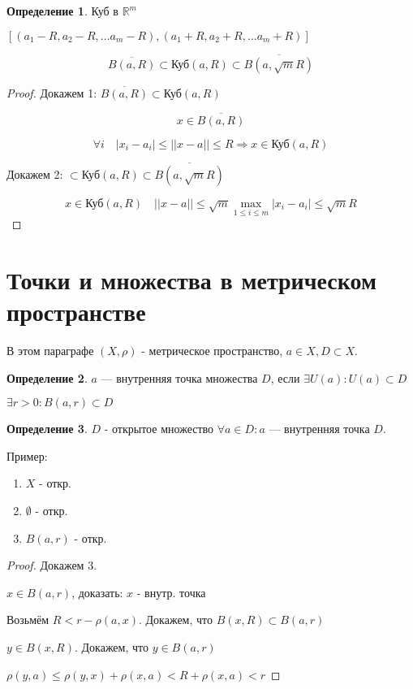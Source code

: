\documentclass[12pt]{article}
\theoremstyle{plain}
\theoremstyle{remark}
\theoremstyle{definition}
\newtheorem*{definition}{Определение}
\begin{document}
\begin{definition}
    Куб в $\mathbb{R}^m$

    $[(a_1-R,a_2-R,\ldots a_m-R), (a_1+R,a_2+R,\ldots a_m+R)]$
\end{definition}

$$\overline{B(a,R)}\subset\text{Куб}(a,R)\subset \overline{B(a,\sqrt mR)}$$

\begin{proof}
    Докажем 1: $\overline{B(a,R)}\subset\text{Куб}(a,R)$

    $$x\in \overline{B(a,R)}$$

    $$\forall i \quad |x_i-a_i|\leq ||x-a||\leq R \Rightarrow x\in\text{Куб}(a,R)$$

    Докажем 2: $\subset\text{Куб}(a,R)\subset \overline{B(a,\sqrt mR)}$

    $$x\in\text{Куб}(a,R)\quad ||x-a||\leq\sqrt m \max\limits_{1\leq i\leq m} |x_i-a_i|\leq \sqrt mR$$
\end{proof}

\section{Точки и множества в метрическом пространстве}

В этом параграфе $(X,\rho)$ - метрическое пространство, $a\in X, D\subset X$.

\begin{definition}
    $a$ --- внутренняя точка множества $D$, если $\exists U(a) : U(a)\subset D$

    $\exists r>0 : B(a,r)\subset D$
\end{definition}

\begin{definition}
    $D$ - открытое множество $\forall a\in D : a$ --- внутренняя точка $D$. 
\end{definition}

Пример:
\begin{enumerate}
    \itemsep0em
    \item $X$ - откр.
    \item $\emptyset$ - откр.
    \item $B(a,r)$ - откр.
\end{enumerate}

\begin{proof}
    Докажем 3.

    $x\in B(a,r)$, доказать: $x$ - внутр. точка

    Возьмём $R<r-\rho(a,x)$. Докажем, что $B(x,R)\subset B(a,r)$

    $y\in B(x,R)$. Докажем, что $y\in B(a,r)$

    $\rho(y,a)\leq\rho(y,x)+\rho(x,a)<R+\rho(x,a)<r$
\end{proof}
\end{document}
